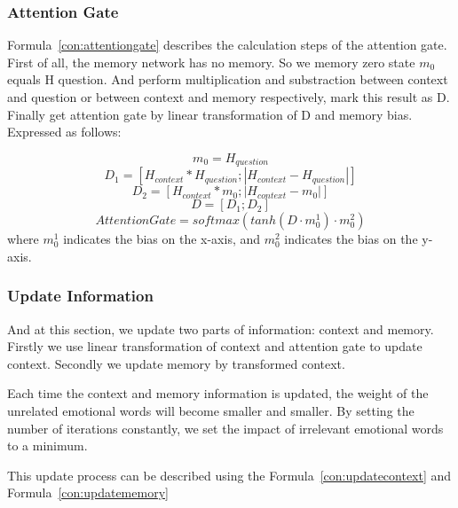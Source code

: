 \documentclass{ieeeaccess}
\begin{document}
\subsubsection{Attention Gate}
Formula~\ref{con:attentiongate} describes the calculation steps of the attention gate. First of all, the memory network has no memory. So we memory zero state $m_0$ equals H question. And perform multiplication and substraction between context and question  or between context and memory respectively, mark this result as D. Finally get attention gate by linear transformation of D and memory bias. Expressed as follows:

\begin{equation}m_0 = H_{question}\end{equation}
\begin{equation}D_1 = [H_{context}*H_{question}; |H_{context}-H_{question}|]\end{equation}
\begin{equation}D_2 = [H_{context}*m_0; |H_{context}-m_0|]\end{equation}
\begin{equation}D = [D_1; D_2]\end{equation}
\begin{equation}AttentionGate = softmax(tanh(D\cdot m_0^1)\cdot m_0^2)\end{equation}
where $m_0^1$ indicates the bias on the x-axis, and $m_0^2$ indicates the bias on the y-axis.

\subsubsection{Update Information}
And at this section, we update two parts of information: context and memory. Firstly we use linear transformation of context and attention gate to update context. Secondly we update memory by transformed context. 

Each time the context and memory information is updated, the weight of the unrelated emotional words will become smaller and smaller. By setting the number of iterations constantly, we set the impact of irrelevant emotional words to a minimum.

This update process can be described using the Formula~\ref{con:updatecontext} and Formula~\ref{con:updatememory}
\end{document}
